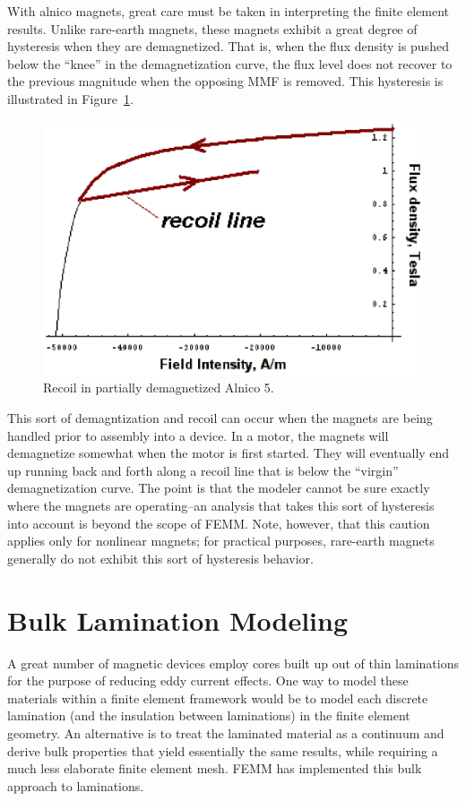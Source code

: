 \documentclass[12pt]{report}
\begin{document}
With alnico magnets, great care
must be taken in interpreting the finite element results.  Unlike
rare-earth magnets, these magnets exhibit a great degree of
hysteresis when they are demagnetized.  That is, when the flux
density is pushed below the ``knee'' in the demagnetization curve,
the flux level does not recover to the previous magnitude when the
opposing MMF is removed.  This hysteresis is illustrated in
Figure~\ref{recoiling}.
\begin{figure}
\centerline{\includegraphics{recoil.ps}}
\caption{Recoil in partially demagnetized Alnico 5.}
\label{recoiling}
\end{figure}
This sort of demagntization and recoil can occur when the magnets
are being handled prior to assembly into a device.  In a motor, the
magnets will demagnetize somewhat when the motor is first started.
They will eventually end up running back and forth along a recoil
line that is below the ``virgin'' demagnetization curve.  The point
is that the modeler cannot be sure exactly where the magnets are
operating--an analysis that takes this sort of hysteresis into
account is beyond the scope of FEMM.  Note, however, that this
caution applies only for nonlinear magnets; for practical purposes,
rare-earth magnets generally do not exhibit this sort of hysteresis
behavior.

\section {Bulk Lamination Modeling} \label{app_lam}

A great number of magnetic devices employ cores built up out of
thin laminations for the purpose of reducing eddy current effects.
One way to model these materials within a finite element framework
would be to model each discrete lamination (and the insulation
between laminations) in the finite element geometry.  An
alternative is to treat the laminated material as a continuum and
derive bulk properties that yield essentially the same results,
while requiring a much less elaborate finite element mesh.  FEMM
has implemented this bulk approach to laminations.
\end{document}
